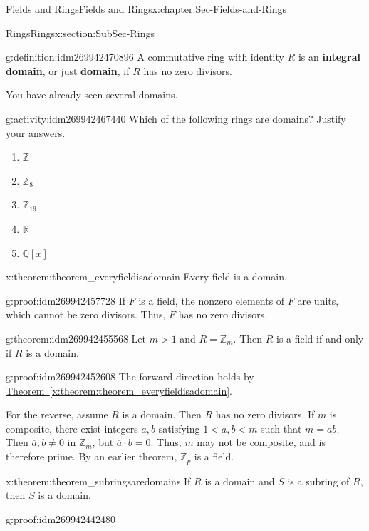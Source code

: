 \documentclass[oneside,10pt,]{book}
\newcommand{\terminology}[1]{\textbf{#1}}
\numberwithin{equation}{section}
\def\Z{{\mathbb Z}}
\def\Q{{\mathbb Q}}
\def\R{{\mathbb R}}
\newcommand{\lt}{<}
\begin{document}
\begin{chapterptx}{Fields and Rings}{}{Fields and Rings}{}{}{x:chapter:Sec-Fields-and-Rings}
\begin{sectionptx}{Rings}{}{Rings}{}{}{x:section:SubSec-Rings}
\begin{definition}{}{g:definition:idm269942470896}%
A commutative ring with identity \(R\) is an \terminology{integral domain}, or just \terminology{domain}, if \(R\) has no zero divisors.%
\end{definition}
You have already seen several domains.%
\begin{activity}{}{g:activity:idm269942467440}%
Which of the following rings are domains? Justify your answers.%
\begin{enumerate}
\item{}\(\Z\)%
\item{}\(\Z_{8}\)%
\item{}\(\Z_{19}\)%
\item{}\(\R\)%
\item{}\(\Q[x]\)%
\end{enumerate}
%
\end{activity}
\begin{theorem}{}{}{x:theorem:theorem_everyfieldisadomain}%
Every field is a domain.%
\end{theorem}
\begin{proofptx}{}{g:proof:idm269942457728}
If \(F\) is a field, the nonzero elements of \(F\) are units, which cannot be zero divisors. Thus, \(F\) has no zero divisors.%
\end{proofptx}
\begin{theorem}{}{}{g:theorem:idm269942455568}%
Let \(m > 1\) and \(R = \Z_m\). Then \(R\) is a field if and only if \(R\) is a domain.%
\end{theorem}
\begin{proofptx}{}{g:proof:idm269942452608}
The forward direction holds by \hyperref[x:theorem:theorem_everyfieldisadomain]{Theorem~\ref{x:theorem:theorem_everyfieldisadomain}}.%
\par
For the reverse, assume \(R\) is a domain. Then \(R\) has no zero divisors. If \(m\) is composite, there exist integers \(a,b\) satisfying \(1 \lt a,b \lt m\) such that \(m=ab\). Then \(\overline{a},\overline{b}\ne \overline{0}\) in \(\Z_m\), but \(\overline{a}\cdot \overline{b} = \overline{0}\). Thus, \(m\) may not be composite, and is therefore prime. By an earlier theorem, \(\Z_p\) is a field.%
\end{proofptx}
\begin{theorem}{}{}{x:theorem:theorem_subringsaredomains}%
If \(R\) is a domain and \(S\) is a subring of \(R\), then \(S\) is a domain.%
\end{theorem}
\begin{proofptx}{}{g:proof:idm269942442480}

\end{proofptx}
\end{sectionptx}
\end{chapterptx}
\end{document}
